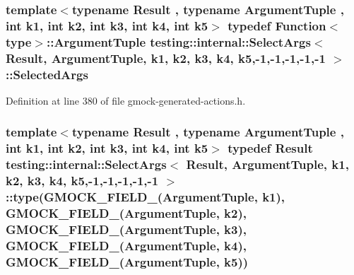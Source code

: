 \subsubsection[{\texorpdfstring{Selected\+Args}{SelectedArgs}}]{\setlength{\rightskip}{0pt plus 5cm}template$<$typename Result , typename Argument\+Tuple , int k1, int k2, int k3, int k4, int k5$>$ typedef {\bf Function}$<${\bf type}$>$\+::{\bf Argument\+Tuple} {\bf testing\+::internal\+::\+Select\+Args}$<$ {\bf Result}, {\bf Argument\+Tuple}, k1, k2, k3, k4, k5,-\/1,-\/1,-\/1,-\/1,-\/1 $>$\+::{\bf Selected\+Args}}\hypertarget{classtesting_1_1internal_1_1_select_args_3_01_result_00_01_argument_tuple_00_01k1_00_01k2_00_01k6e7fa8d2e210d646d72ee410b10aa03c_a96d3b235ab6a72004f4fe2492a3ddd66}{}\label{classtesting_1_1internal_1_1_select_args_3_01_result_00_01_argument_tuple_00_01k1_00_01k2_00_01k6e7fa8d2e210d646d72ee410b10aa03c_a96d3b235ab6a72004f4fe2492a3ddd66}


Definition at line 380 of file gmock-\/generated-\/actions.\+h.

\subsubsection[{\texorpdfstring{type}{type}}]{\setlength{\rightskip}{0pt plus 5cm}template$<$typename Result , typename Argument\+Tuple , int k1, int k2, int k3, int k4, int k5$>$ typedef {\bf Result} {\bf testing\+::internal\+::\+Select\+Args}$<$ {\bf Result}, {\bf Argument\+Tuple}, k1, k2, k3, k4, k5,-\/1,-\/1,-\/1,-\/1,-\/1 $>$\+::type({\bf G\+M\+O\+C\+K\+\_\+\+F\+I\+E\+L\+D\+\_\+}({\bf Argument\+Tuple}, k1), {\bf G\+M\+O\+C\+K\+\_\+\+F\+I\+E\+L\+D\+\_\+}({\bf Argument\+Tuple}, k2), {\bf G\+M\+O\+C\+K\+\_\+\+F\+I\+E\+L\+D\+\_\+}({\bf Argument\+Tuple}, k3), {\bf G\+M\+O\+C\+K\+\_\+\+F\+I\+E\+L\+D\+\_\+}({\bf Argument\+Tuple}, k4), {\bf G\+M\+O\+C\+K\+\_\+\+F\+I\+E\+L\+D\+\_\+}({\bf Argument\+Tuple}, k5))}\hypertarget{classtesting_1_1internal_1_1_select_args_3_01_result_00_01_argument_tuple_00_01k1_00_01k2_00_01k6e7fa8d2e210d646d72ee410b10aa03c_aadb1557e45bff523a2d0abe5a539a58d}{}\label{classtesting_1_1internal_1_1_select_args_3_01_result_00_01_argument_tuple_00_01k1_00_01k2_00_01k6e7fa8d2e210d646d72ee410b10aa03c_aadb1557e45bff523a2d0abe5a539a58d}


